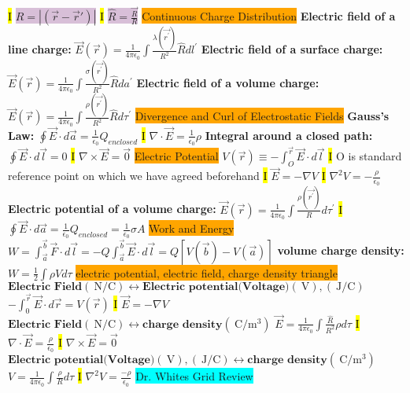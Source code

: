 \documentclass[fontsize=4pt]{scrartcl}
\begin{document}
\hl{I}
\colorbox{Thistle}{$R = |(\vec{r}-\vec{r}\prime)|$}
\hl{I}
\colorbox{Thistle}{$\hat{R} = \frac{\vec{R}}{R}$}
\colorbox{Orange}{Continuous Charge Distribution}
\textbf{Electric field of a line charge:}
$\vec{E} (\vec{r}) = \frac{1}{4\pi \epsilon_{0}} \int \frac{\lambda (\vec{r^{\prime} })} {R^2} \hat{R} dl^{\prime}$
\textbf{Electric field of a surface charge:}
$\vec{E} (\vec{r}) = \frac{1}{4\pi \epsilon_{0}} \int \frac{\sigma (\vec{r^{\prime} })} {R^2} \hat{R} da^{\prime}$
\textbf{Electric field of a volume charge:}
$\vec{E} (\vec{r}) = \frac{1}{4\pi \epsilon_{0}} \int \frac{\rho (\vec{r^{\prime} })} {R^2} \hat{R} d\tau^{\prime}$
\colorbox{Orange}{Divergence and Curl of Electrostatic Fields}
\textbf{Gauss's Law:}
$\oint \vec{E} \cdot d\vec{a} = \frac{1}{\epsilon_0}Q_{enclosed}$
\hl{I}
$\nabla \cdot \vec{E} = \frac{1}{\epsilon_0} \rho$
\textbf{Integral around a closed path:}
$\oint \vec{E} \cdot d\vec{l} = 0$
\hl{I}
$\nabla \times \vec{E} = \vec{0}$
\colorbox{Orange}{Electric Potential}
$V(\vec{r}) \equiv - \int_{O}^{\vec{r}} \vec{E} \cdot d\vec{l}$
\hl{I}
O is standard reference point on which we have agreed beforehand
\hl{I}
$\vec{E} = - \nabla V$
\hl{I}
$\nabla^2 V = -\frac{\rho}{\epsilon_0}$
\textbf{Electric potential of a volume charge:}
$\vec{E} (\vec{r}) = \frac{1}{4\pi \epsilon_{0}} \int \frac{\rho (\vec{r^{\prime} })} {R} d\tau^{\prime}$
\hl{I}
$\oint \vec{E} \cdot d\vec{a} = \frac{1}{\epsilon_0} Q_{enclosed} = \frac{1}{\epsilon_0} \sigma A$
\colorbox{Orange}{Work and Energy}
$W=\int_{\vec{a}}^{\vec{b}} \vec{F} \cdot d\vec{l} = - Q \int_{\vec{a}}^{\vec{b}} \vec{E} \cdot d\vec{l} = Q[V(\vec{b}) - V( \vec{a}) ]$
\textbf{volume charge density:}
$W = \frac{1}{2} \int \rho V d\tau$
\colorbox{Orange}{electric potential, electric field, charge density triangle}
$\textbf{Electric Field} (\SI{}{\newton / \coulomb}) \leftrightarrow \textbf{Electric potential(Voltage)} (\SI{}{\volt}), (\SI{}{\joule / \coulomb})  $ 
$-\int_{0}^{\vec{r}} \vec{E} \cdot d\vec{r} = V(\vec{r})$
\hl{I}
$\vec{E} = -\nabla V$
$\textbf{Electric Field} (\SI{}{\newton / \coulomb}) \leftrightarrow \textbf{charge density} (\SI{}{\coulomb / \meter^3})$
$\vec{E} = \frac{1}{4\pi \epsilon_0}\int \frac{\hat{R}}{R^2}\rho d\tau$
\hl{I}
$\nabla \cdot \vec{E} = \frac{\rho}{\epsilon_0}$
\hl{I}
$\nabla \times \vec{E} = \vec{0}$
$ \textbf{Electric potential(Voltage)} (\SI{}{\volt}), (\SI{}{\joule / \coulomb}) \leftrightarrow \textbf{charge density} (\SI{}{\coulomb / \meter^3})$
$V = \frac{1}{4\pi \epsilon_0}\int \frac{\rho}{R}d\tau$
\hl{I}
$\nabla^2 V = \frac{-\rho}{\epsilon_0}$
\colorbox{Cyan}{Dr. Whites Grid Review}
\end{document}
